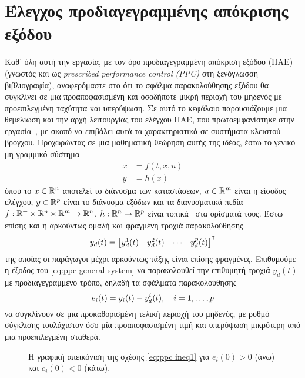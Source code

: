 \chapter{Έλεγχος προδιαγεγραμμένης απόκρισης εξόδου}
\label{chap:ppc}

Καθ' όλη αυτή την εργασία, με τον όρο προδιαγεγραμμένη απόκριση εξόδου (ΠΑΕ) (γνωστός και ως \textlatin{\emph{prescribed performance control (PPC)}} στη ξενόγλωσση βιβλιογραφία), αναφερόμαστε στο ότι το σφάλμα παρακολούθησης εξόδου θα συγκλίνει σε μια προαποφασισμένη και οσοδήποτε μικρή περιοχή του μηδενός με προεπιλεγμένη ταχύτητα και υπερύψωση. Σε αυτό το κεφάλαιο παρουσιάζουμε μια θεμελίωση και την αρχή λειτουργίας του ελέγχου ΠΑΕ, που πρωτοεμφανίστηκε στην εργασία~\cite{bechlioulis2008robust}, με σκοπό να επιβάλει αυτά τα χαρακτηριστικά σε συστήματα κλειστού βρόγχου. Προχωρώντας σε μια μαθηματική θεώρηση αυτής της ιδέας, έστω το γενικό μη-γραμμικό σύστημα
\begin{equation}
    \label{eq:ppc general system}
    \begin{split}
        \dot x &= f(t, x, u)\\
        y &= h(x)
    \end{split}
\end{equation}
όπου το $x \in \mathbb{R}^n$ αποτελεί το διάνυσμα των καταστάσεων, $u \in \mathbb{R}^m$ είναι η είσοδος ελέγχου, $y \in \mathbb{R}^p$ είναι το διάνυσμα εξόδων και τα διανυσματικά πεδία $f: \mathbb{R}^+ \times \mathbb{R}^n \times \mathbb{R}^m \rightarrow \mathbb{R}^n$, $h: \mathbb{R}^n \rightarrow \mathbb{R}^p$ είναι τοπικά \lip\ στα ορίσματά τους. Έστω επίσης και η αρκούντως ομαλή και φραγμένη τροχιά παρακολούθησης
\[
    y_d(t) = \bmqty{y_d^1(t) & y_d^2(t) & \cdots & y_d^p(t)}^\T
\]
της οποίας οι παράγωγοι μέχρι αρκούντως τάξης είναι επίσης φραγμένες. Επιθυμούμε η έξοδος του \cref{eq:ppc general system} να παρακολουθεί την επιθυμητή τροχιά $y_d(t)$ με προδιαγεγραμμένο τρόπο, δηλαδή τα σφάλματα παρακολούθησης
\[
    e_i(t) = y_i(t) - y_d^i(t)\qc i = 1, \ldots, p
\]
να συγκλίνουν σε μια προκαθορισμένη τελική περιοχή του μηδενός, με ρυθμό σύγκλισης τουλάχιστον όσο μία προαποφασισμένη τιμή και υπερύψωση μικρότερη από μια προεπιλεγμένη σταθερά.

\begin{figure}[t]
    \centering
    
    \caption{Η γραφική απεικόνιση της σχέσης \cref{eq:ppc ineq1} για $e_i(0) > 0$ (άνω) και $e_i(0) < 0$ (κάτω).}
    \label{fig:ppc_perf_functions}
\end{figure}

